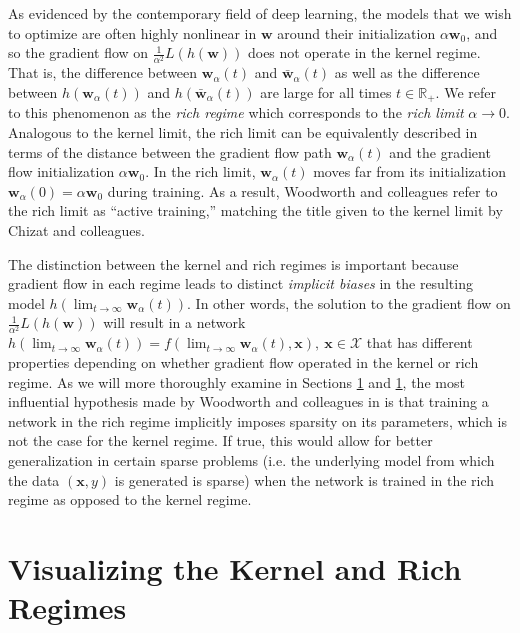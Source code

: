 \documentclass{article}
\begin{document}
As evidenced by the contemporary field of deep learning, the models that we wish to optimize are often highly nonlinear in $\boldsymbol{w}$ around their initialization $\alpha\boldsymbol{w}_0$, and so the gradient flow on $\frac{1}{\alpha^2}L(h(\boldsymbol{w}))$ does not operate in the kernel regime. That is, the difference between $\boldsymbol{w}_{\alpha}(t)$ and $\boldsymbol{\bar{w}}_{\alpha}(t)$ as well as the difference between $h(\boldsymbol{w}_{\alpha}(t))$ and $h(\boldsymbol{\bar{w}}_{\alpha}(t))$ are large for all times $t \in \mathbb{R}_+$. We refer to this phenomenon as the \textit{rich regime} which corresponds to the \textit{rich limit} $\alpha \rightarrow 0$. Analogous to the kernel limit, the rich limit can be equivalently described in terms of the distance between the gradient flow path $\boldsymbol{w}_{\alpha}(t)$ and the gradient flow initialization $\alpha\boldsymbol{w}_0$. In the rich limit, $\boldsymbol{w}_{\alpha}(t)$ moves far from its initialization $\boldsymbol{w}_{\alpha}(0) = \alpha \boldsymbol{w}_0$ during training. As a result, Woodworth and colleagues refer to the rich limit as \enquote{active training,} matching the title given to the kernel limit by Chizat and colleagues.

The distinction between the kernel and rich regimes is important because gradient flow in each regime leads to distinct \textit{implicit biases} in the resulting model $h(\lim_{t \to\infty} \boldsymbol{w}_{\alpha}(t))$. In other words, the solution to the gradient flow on $\frac{1}{\alpha^2}L(h(\boldsymbol{w}))$ will result in a network $h(\lim_{t \to\infty} \boldsymbol{w}_{\alpha}(t)) = f(\lim_{t \to\infty} \boldsymbol{w}_{\alpha}(t), \boldsymbol{x}), \ \boldsymbol{x} \in \mathcal{X}$ that has different properties depending on whether gradient flow operated in the kernel or rich regime. As we will more thoroughly examine in Sections \ref{summarizekernel} and \ref{summarizekernel}, the most influential hypothesis made by Woodworth and colleagues in \cite{woodworth2020kernel} is that training a network in the rich regime implicitly imposes sparsity on its parameters, which is not the case for the kernel regime. If true, this would allow for better generalization in certain sparse problems (i.e. the underlying model from which the data $(\boldsymbol{x}, y)$ is generated is sparse) when the network is trained in the rich regime as opposed to the kernel regime.

\section{Visualizing the Kernel and Rich Regimes}\label{summarizekernel}
\end{document}
